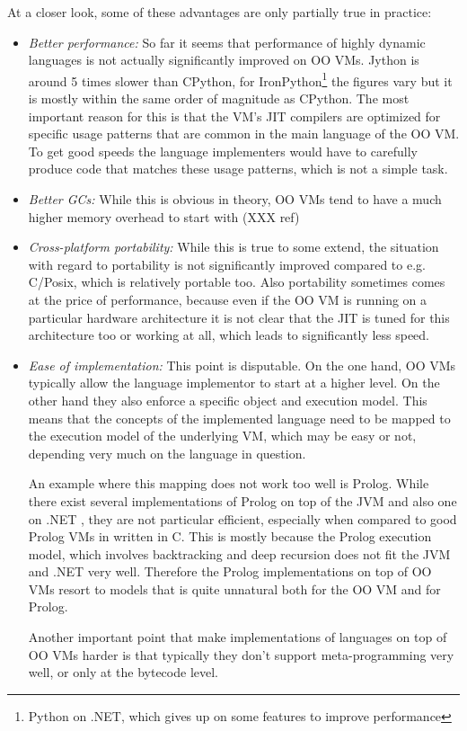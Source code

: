 \documentclass{llncs}
\begin{document}
At a closer look, some of these advantages are only partially true in practice:

\begin{itemize}
\item
\emph{Better performance:} So far it seems that performance of highly dynamic
languages is not actually significantly improved on OO VMs. 
Jython is around 5
times slower than CPython, for IronPython\footnote{Python on .NET, which
gives up on some features to improve performance}
the figures vary but it is mostly
within the same order of magnitude as CPython. The most important reason for
this is that the VM's JIT compilers are optimized for specific usage patterns
that are common in the main language of the OO VM. To get good speeds the
language implementers would have to carefully produce code that matches these
usage patterns, which is not a simple task.

\item
\emph{Better GCs:} While this is obvious in theory, OO VMs tend to have a much
higher memory overhead to start with (XXX ref)

\item
\emph{Cross-platform portability:} While this is true to some extend, the
situation with regard to portability is not significantly improved compared to
e.g.  C/Posix, which is relatively portable too. Also portability sometimes
comes at the price of performance, because even if the OO VM is running on a
particular hardware architecture it is not clear that the JIT is tuned for this
architecture too or working at all, which leads to significantly less
speed.

\item
\emph{Ease of implementation:} This point is disputable. On the one hand, OO
VMs typically allow the language implementor to start at a higher level. On the
other hand they also enforce a specific object and execution model. This means
that the concepts of the implemented language need to be mapped to the
execution model of the underlying VM, which may be easy or not, depending very
much on the language in question.

An example where this mapping does not work too well is Prolog. While there
exist several implementations of Prolog on top of the JVM \cite{prologcafe}
\cite{InterProlog} and also one on .NET \cite{psharp},
they are not particular efficient, especially when compared to good Prolog VMs
in written in C. This is mostly because the Prolog execution model, which
involves backtracking and deep recursion does not fit the JVM and .NET very
well. Therefore the Prolog implementations on top of OO VMs resort to models
that is quite unnatural both for the OO VM and for Prolog.

Another important point that make implementations of languages on top of OO VMs
harder is that typically they don't support meta-programming very well, or only
at the bytecode level.
\end{itemize}
\end{document}
